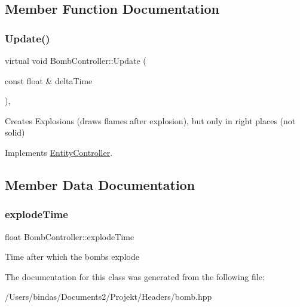 \subsection{Member Function Documentation}
\mbox{\label{class_bomb_controller_ae84cb29af5b075c6802760105036abeb}} 
\subsubsection{\texorpdfstring{Update()}{Update()}}
{\footnotesize\ttfamily virtual void Bomb\+Controller\+::\+Update (\begin{DoxyParamCaption}\item[{const float \&}]{delta\+Time }\end{DoxyParamCaption})\hspace{0.3cm}{\ttfamily [override]}, {\ttfamily [virtual]}}

Creates Explosions (draws flames after explosion), but only in right places (not solid) 

Implements \mbox{\hyperlink{class_entity_controller_ab7f285a1c788ab04b9f0c0260dc8c523}{Entity\+Controller}}.



\subsection{Member Data Documentation}
\mbox{\label{class_bomb_controller_a8d957cdfb20acb8df26e4e3009ea37b6}} 
\subsubsection{\texorpdfstring{explodeTime}{explodeTime}}
{\footnotesize\ttfamily float Bomb\+Controller\+::explode\+Time\hspace{0.3cm}{\ttfamily [private]}}

Time after which the bombs explode 

The documentation for this class was generated from the following file\+:\begin{DoxyCompactItemize}
\item 
/\+Users/bindas/\+Documents2/\+Projekt/\+Headers/bomb.\+hpp\end{DoxyCompactItemize}
